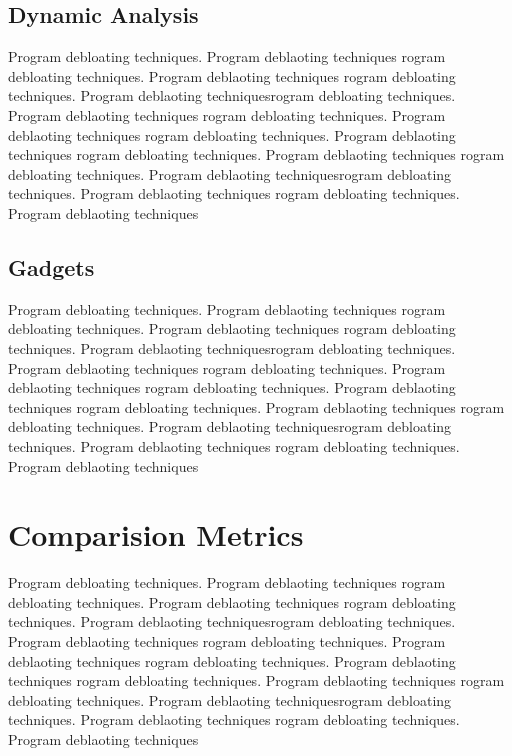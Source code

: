 \documentclass{relatorio}
\begin{document}
\subsection{Dynamic Analysis}%
\label{Tools}

Program debloating techniques. Program deblaoting techniques rogram debloating techniques. Program deblaoting techniques
rogram debloating techniques. Program deblaoting techniquesrogram debloating techniques. Program deblaoting techniques
rogram debloating techniques. Program deblaoting techniques rogram debloating techniques. Program deblaoting techniques
rogram debloating techniques. Program deblaoting techniques 
rogram debloating techniques. Program deblaoting techniquesrogram debloating techniques. Program deblaoting techniques
rogram debloating techniques. Program deblaoting techniques

\subsection{Gadgets}%
\label{Tools}

Program debloating techniques. Program deblaoting techniques rogram debloating techniques. Program deblaoting techniques
rogram debloating techniques. Program deblaoting techniquesrogram debloating techniques. Program deblaoting techniques
rogram debloating techniques. Program deblaoting techniques rogram debloating techniques. Program deblaoting techniques
rogram debloating techniques. Program deblaoting techniques 
rogram debloating techniques. Program deblaoting techniquesrogram debloating techniques. Program deblaoting techniques
rogram debloating techniques. Program deblaoting techniques

\section{Comparision Metrics}%
\label{Tools}

Program debloating techniques. Program deblaoting techniques rogram debloating techniques. Program deblaoting techniques
rogram debloating techniques. Program deblaoting techniquesrogram debloating techniques. Program deblaoting techniques
rogram debloating techniques. Program deblaoting techniques rogram debloating techniques. Program deblaoting techniques
rogram debloating techniques. Program deblaoting techniques 
rogram debloating techniques. Program deblaoting techniquesrogram debloating techniques. Program deblaoting techniques
rogram debloating techniques. Program deblaoting techniques
\end{document}
